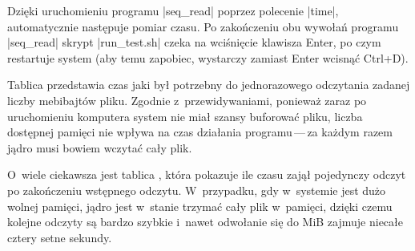Dzięki uruchomieniu programu \code|seq_read| poprzez polecenie
\code|time|, automatycznie następuje pomiar czasu.  Po zakończeniu obu
wywołań programu \code|seq_read| skrypt \code|run_test.sh| czeka na
wciśnięcie klawisza Enter, po czym restartuje system (aby temu
zapobiec, wystarczy zamiast Enter wcisnąć Ctrl+D).



Tablica  przedstawia czas jaki był
potrzebny do jednorazowego odczytania zadanej liczby mebibajtów pliku.
Zgodnie z~przewidywaniami, ponieważ zaraz po uruchomieniu komputera
system nie miał szansy buforować pliku, liczba dostępnej pamięci nie
wpływa na czas działania programu\,---\,za każdym razem jądro musi
bowiem wczytać cały plik.

O~wiele ciekawsza jest tablica ,
która pokazuje ile czasu zajął pojedynczy odczyt po zakończeniu
wstępnego odczytu.  W~przypadku, gdy w~systemie jest dużo wolnej
pamięci, jądro jest w~stanie trzymać cały plik w~pamięci, dzięki czemu
kolejne odczyty są bardzo szybkie i~nawet odwołanie się do
\unit[900]{MiB} zajmuje niecałe cztery setne sekundy.


